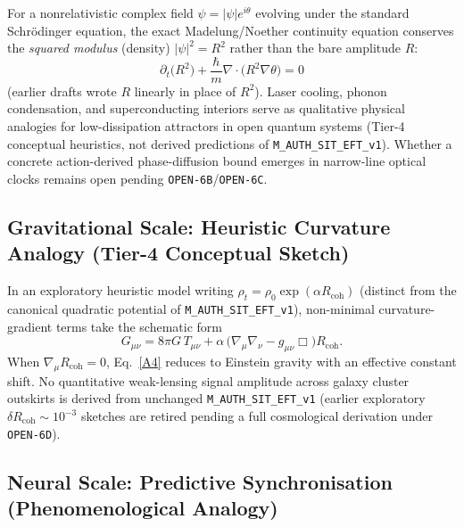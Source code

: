 For a nonrelativistic complex field $\psi = |\psi|e^{i\theta}$ evolving under the standard Schr\"odinger equation, the exact Madelung/Noether continuity equation conserves the \emph{squared modulus} (density) $|\psi|^2 = R^2$ rather than the bare amplitude $R$:
\begin{equation}
\partial_{t}\bigl(R^2\bigr)
   +\frac{\hbar}{m}
     \nabla\!\cdot\!\bigl(R^2\nabla\theta\bigr)
   = 0
\tag{A3}\label{A3}
\end{equation}
(earlier drafts wrote $R$ linearly in place of $R^2$). Laser cooling, phonon condensation, and superconducting interiors serve as qualitative physical analogies for low-dissipation attractors in open quantum systems (Tier-4 conceptual heuristics, not derived predictions of \texttt{M\_AUTH\_SIT\_EFT\_v1}). Whether a concrete action-derived phase-diffusion bound emerges in narrow-line optical clocks remains open pending \texttt{OPEN-6B}/\texttt{OPEN-6C}.

\subsection{Gravitational Scale: Heuristic Curvature Analogy (Tier-4 Conceptual Sketch)}

In an exploratory heuristic model writing $\rho_{t}= \rho_{0}\exp(\alpha R_{\mathrm{coh}})$ (distinct from the canonical quadratic potential of \texttt{M\_AUTH\_SIT\_EFT\_v1}), non-minimal curvature-gradient terms take the schematic form
\[
G_{\mu\nu}=8\pi G\,T_{\mu\nu}
+\alpha\,\bigl(\nabla_{\!\mu}\nabla_{\!\nu}-g_{\mu\nu}\Box\bigr)R_{\mathrm{coh}} .
\tag{A4}\label{A4}
\]
When $\nabla_{\mu}R_{\mathrm{coh}}=0$, Eq.~\eqref{A4} reduces to Einstein gravity with an effective constant shift. No quantitative weak-lensing signal amplitude across galaxy cluster outskirts is derived from unchanged \texttt{M\_AUTH\_SIT\_EFT\_v1} (earlier exploratory $\delta R_{\mathrm{coh}}\sim 10^{-3}$ sketches are retired pending a full cosmological derivation under \texttt{OPEN-6D}).

\subsection{Neural Scale: Predictive Synchronisation (Phenomenological Analogy)}

